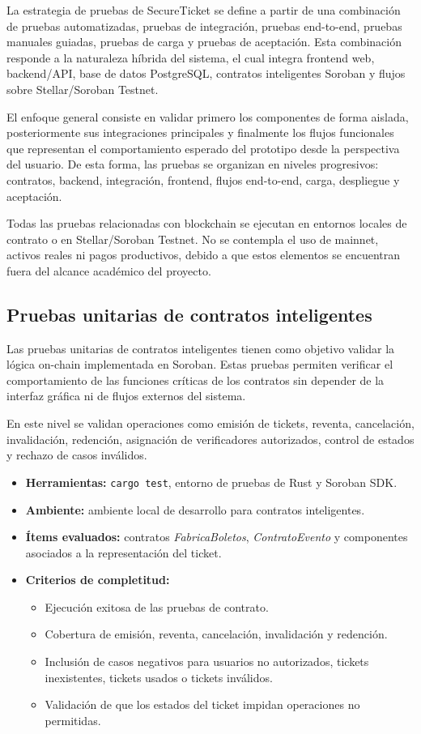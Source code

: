 \documentclass[12pt,letterpaper]{article}
\newcommand{\NombreProyecto}{SecureTicket}
\begin{document}
La estrategia de pruebas de \NombreProyecto{} se define a partir de una combinación de pruebas automatizadas, pruebas de integración, pruebas end-to-end, pruebas manuales guiadas, pruebas de carga y pruebas de aceptación. Esta combinación responde a la naturaleza híbrida del sistema, el cual integra frontend web, backend/API, base de datos PostgreSQL, contratos inteligentes Soroban y flujos sobre Stellar/Soroban Testnet.

El enfoque general consiste en validar primero los componentes de forma aislada, posteriormente sus integraciones principales y finalmente los flujos funcionales que representan el comportamiento esperado del prototipo desde la perspectiva del usuario. De esta forma, las pruebas se organizan en niveles progresivos: contratos, backend, integración, frontend, flujos end-to-end, carga, despliegue y aceptación.

Todas las pruebas relacionadas con blockchain se ejecutan en entornos locales de contrato o en Stellar/Soroban Testnet. No se contempla el uso de mainnet, activos reales ni pagos productivos, debido a que estos elementos se encuentran fuera del alcance académico del proyecto.

\subsection{Pruebas unitarias de contratos inteligentes}

Las pruebas unitarias de contratos inteligentes tienen como objetivo validar la lógica on-chain implementada en Soroban. Estas pruebas permiten verificar el comportamiento de las funciones críticas de los contratos sin depender de la interfaz gráfica ni de flujos externos del sistema.

En este nivel se validan operaciones como emisión de tickets, reventa, cancelación, invalidación, redención, asignación de verificadores autorizados, control de estados y rechazo de casos inválidos.

\begin{itemize}
    \item \textbf{Herramientas:} \texttt{cargo test}, entorno de pruebas de Rust y Soroban SDK.
    \item \textbf{Ambiente:} ambiente local de desarrollo para contratos inteligentes.
    \item \textbf{Ítems evaluados:} contratos \textit{FabricaBoletos}, \textit{ContratoEvento} y componentes asociados a la representación del ticket.
    \item \textbf{Criterios de completitud:}
    \begin{itemize}
        \item Ejecución exitosa de las pruebas de contrato.
        \item Cobertura de emisión, reventa, cancelación, invalidación y redención.
        \item Inclusión de casos negativos para usuarios no autorizados, tickets inexistentes, tickets usados o tickets inválidos.
        \item Validación de que los estados del ticket impidan operaciones no permitidas.
    \end{itemize}
\end{itemize}
\end{document}
